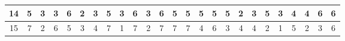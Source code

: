 \begin{sidewaystable}[]
\begin{tabular}{|c|c|c|c|c|c|c|c|c|c|c|c|c|c|c|c|c|c|c|c|c|c|c|c|c|}
    14      & 5                                               & 3                                               & 3                                               & 6                                               & 2                                               & 3                                               & 5                                               & 3                                               & 6                                               & 3                                                & 6                                                & 5                                                & 5                                               & 5                                               & 5                                               & 5                                               & 2                                               & 3                                               & 5                                               & 3                                               & 4                                               & 4                                                & 6                                                & 6                                                \\ \hline
    15      & 7                                               & 2                                               & 6                                               & 5                                               & 3                                               & 4                                               & 7                                               & 1                                               & 7                                               & 2                                                & 7                                                & 7                                                & 7                                               & 4                                               & 6                                               & 3                                               & 4                                               & 4                                               & 2                                               & 1                                               & 5                                               & 2                                                & 3                                                & 6                                                \\ \hline

\end{tabular}
\end{sidewaystable}
